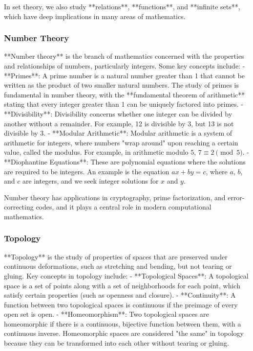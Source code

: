 \documentclass{article}
\begin{document}
In set theory, we also study **relations**, **functions**, and **infinite sets**, which have deep implications in many areas of mathematics.

\subsubsection*{Number Theory}

**Number theory** is the branch of mathematics concerned with the properties and relationships of numbers, particularly integers. Some key concepts include:
- **Primes**: A prime number is a natural number greater than 1 that cannot be written as the product of two smaller natural numbers. The study of primes is fundamental in number theory, with the **fundamental theorem of arithmetic** stating that every integer greater than 1 can be uniquely factored into primes.
- **Divisibility**: Divisibility concerns whether one integer can be divided by another without a remainder. For example, 12 is divisible by 3, but 13 is not divisible by 3.
- **Modular Arithmetic**: Modular arithmetic is a system of arithmetic for integers, where numbers "wrap around" upon reaching a certain value, called the modulus. For example, in arithmetic modulo 5, \( 7 \equiv 2 \pmod{5} \).
- **Diophantine Equations**: These are polynomial equations where the solutions are required to be integers. An example is the equation \( ax + by = c \), where \( a \), \( b \), and \( c \) are integers, and we seek integer solutions for \( x \) and \( y \).

Number theory has applications in cryptography, prime factorization, and error-correcting codes, and it plays a central role in modern computational mathematics.

\subsubsection*{Topology}

**Topology** is the study of properties of spaces that are preserved under continuous deformations, such as stretching and bending, but not tearing or gluing. Key concepts in topology include:
- **Topological Spaces**: A topological space is a set of points along with a set of neighborhoods for each point, which satisfy certain properties (such as openness and closure).
- **Continuity**: A function between two topological spaces is continuous if the preimage of every open set is open.
- **Homeomorphism**: Two topological spaces are homeomorphic if there is a continuous, bijective function between them, with a continuous inverse. Homeomorphic spaces are considered "the same" in topology because they can be transformed into each other without tearing or gluing.
\end{document}
